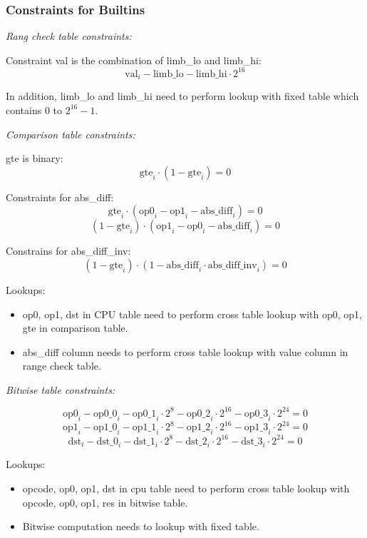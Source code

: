 \subsubsection{Constraints for Builtins} \label{sec:builtins-constraints}

\noindent \emph{Rang check table constraints:}

Constraint val is the combination of limb\_lo and limb\_hi:
\[ \mathrm{val}_i - \mathrm{limb\_lo} - \mathrm{limb\_hi} \cdot 2^{16} \]

In addition, limb\_lo and limb\_hi need to perform lookup with fixed table which contains 0 to $2^{16}-1$.

\noindent \emph{Comparison table constraints:}

gte is binary:
\[ \mathrm{gte}_i \cdot (1 - \mathrm{gte}_i) = 0 \]

Constraints for abs\_diff:
\[ \mathrm{gte}_i \cdot (\mathrm{op0}_i-\mathrm{op1}_i-\mathrm{abs\_diff}_i)=0 \]
\[ (1-\mathrm{gte}_i) \cdot (\mathrm{op1}_i-\mathrm{op0}_i-\mathrm{abs\_diff}_i)=0 \]

Constrains for abs\_diff\_inv:
\[ (1-\mathrm{gte}_i) \cdot (1-\mathrm{abs\_diff}_i \cdot \mathrm{abs\_diff\_inv}_i)=0 \]

Lookups:
\begin{itemize}
    \item op0, op1, dst in CPU table need to perform cross table lookup with op0, op1, gte in comparison table.
    \item abs\_diff column needs to perform cross table lookup with value column in range check table.
\end{itemize}

\noindent \emph{Bitwise table constraints:}

\[ \mathrm{op0}_i - \mathrm{op0\_0}_i - \mathrm{op0\_1}_i \cdot 2^{8} - \mathrm{op0\_2}_i \cdot 2^{16}- \mathrm{op0\_3}_i \cdot 2^{24} = 0 \]
\[ \mathrm{op1}_i - \mathrm{op1\_0}_i - \mathrm{op1\_1}_i \cdot 2^{8} - \mathrm{op1\_2}_i \cdot 2^{16}- \mathrm{op1\_3}_i \cdot 2^{24} = 0 \]
\[ \mathrm{dst}_i - \mathrm{dst\_0}_i - \mathrm{dst\_1}_i \cdot 2^{8} - \mathrm{dst\_2}_i \cdot 2^{16}- \mathrm{dst\_3}_i \cdot 2^{24} = 0 \]

Lookups:
\begin{itemize}
    \item opcode, op0, op1, dst in cpu table need to perform cross table lookup with opcode, op0, op1, res in bitwise table.
    \item Bitwise computation needs to lookup with fixed table.
\end{itemize}

